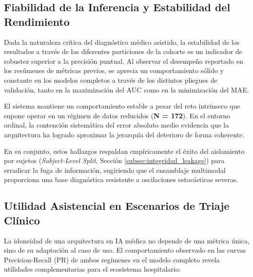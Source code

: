 \documentclass[12pt, oneside, english, spanish]{book}
\begin{document}
\subsection{Fiabilidad de la Inferencia y Estabilidad del Rendimiento} \label{subsec:res_consistencia_operativa}

Dada la naturaleza crítica del diagnóstico médico asistido, la estabilidad de los resultados a través de las diferentes particiones de la cohorte es un indicador de robustez superior a la precisión puntual. Al observar el desempeño reportado en los resúmenes de métricas previos, se aprecia un comportamiento sólido y constante en los modelos completos a través de los distintos pliegues de validación, tanto en la maximización del AUC como en la minimización del MAE.

El sistema mantiene un comportamiento estable a pesar del reto intrínseco que supone operar en un régimen de datos reducidos (\textbf{N = 172}). En el entorno ordinal, la contención sistemática del error absoluto medio evidencia que la arquitectura ha logrado aproximar la jerarquía del deterioro de forma coherente. 

En su conjunto, estos hallazgos respaldan empíricamente el éxito del aislamiento por sujetos (\textit{Subject-Level Split}, Sección \ref{subsec:integridad_leakage}) para erradicar la fuga de información, sugiriendo que el ensamblaje multimodal proporciona una base diagnóstica resistente a oscilaciones estocásticas severas.

\subsection{Utilidad Asistencial en Escenarios de Triaje Clínico} \label{subsec:res_utilidad_cribado}

La idoneidad de una arquitectura en IA médica no depende de una métrica única, sino de su adaptación al caso de uso. El comportamiento observado en las curvas Precision-Recall (PR) de ambos regímenes en el modelo completo revela utilidades complementarias para el ecosistema hospitalario:
\end{document}
